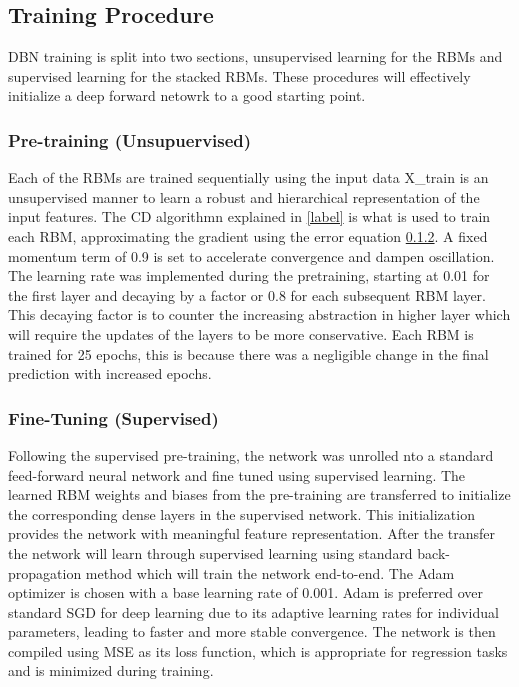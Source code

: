 \subsection{Training Procedure}
 DBN training is split into two sections, unsupervised learning for the RBMs and supervised learning for the stacked RBMs. These procedures will effectively initialize a deep forward netowrk to a good starting point.
 \subsubsection{Pre-training (Unsupuervised)}Each of the RBMs are trained sequentially using the input data X\_train is an unsupervised manner to learn a robust and hierarchical representation of the input features. The CD algorithmn explained in \ref{label} is what is used to train each RBM, approximating the gradient using the error equation \ref{}. A fixed momentum term of 0.9 is set to accelerate convergence and dampen oscillation.\\ The learning rate was implemented during the pretraining, starting at 0.01 for the first layer and decaying by a factor or 0.8 for each subsequent RBM layer. This decaying factor is to counter the increasing abstraction in higher layer which will require the updates of the layers to be more conservative. Each RBM is trained for 25 epochs, this is because there was a negligible change in the final prediction with increased epochs.
 
 \subsubsection{Fine-Tuning (Supervised)} Following the supervised pre-training, the network was unrolled nto a standard feed-forward neural network and fine tuned using supervised learning. The learned RBM weights and biases from the pre-training are transferred to initialize the corresponding dense layers in the supervised network. This initialization provides the network with meaningful feature representation. After the transfer the network will learn through supervised learning using standard back-propagation method which will train the network end-to-end.
 The Adam optimizer is chosen with a base learning rate of 0.001. Adam is preferred over standard SGD for deep learning due to its adaptive learning rates for individual parameters, leading to faster and more stable convergence. The network is then compiled using MSE as its loss function, which is appropriate for regression tasks and is minimized during training.
 
